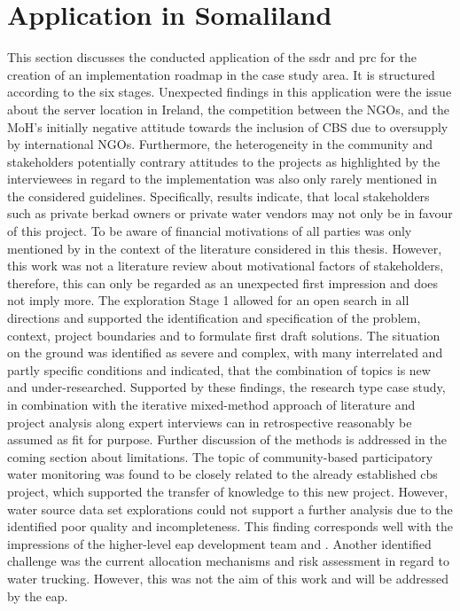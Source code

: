 \section{Application in Somaliland}

This section discusses the conducted application of the \acrshort{ssdr} and \acrshort{prc} for the creation of an implementation roadmap in the case study area. It is structured according to the six stages. Unexpected findings in this application were the issue about the server location in Ireland, the competition between the NGOs, and the MoH's initially negative attitude towards the inclusion of CBS due to oversupply by international NGOs. Furthermore, the heterogeneity in the community and stakeholders potentially contrary attitudes to the projects as highlighted by the interviewees in regard to the implementation was also only rarely mentioned in the considered guidelines. Specifically, results indicate, that local stakeholders such as private berkad owners or private water vendors may not only be in favour of this project. To be aware of financial motivations of all parties was only mentioned by \autocite{minkmanCitizenScienceWater2015} in the context of the literature considered in this thesis. However, this work was not a literature review about motivational factors of stakeholders, therefore, this can only be regarded as an unexpected first impression and does not imply more.\newline
The exploration Stage 1 allowed for an open search in all directions and supported the identification and specification of the problem, context, project boundaries and to formulate first draft solutions. The situation on the ground was identified as severe and complex, with many interrelated and partly specific conditions and indicated, that the combination of topics is new and under-researched. Supported by these findings, the research type case study, in combination with the iterative mixed-method approach of literature and project analysis along expert interviews can in retrospective reasonably be assumed as fit for purpose. Further discussion of the methods is addressed in the coming section about limitations.\newline
The topic of community-based participatory water monitoring was found to be closely related to the already established \acrshort{cbs} project, which supported the transfer of knowledge to this new project. However, water source data set explorations could not support a further analysis due to the identified poor quality and incompleteness. This finding corresponds well with the impressions of the higher-level \acrshort{eap} development team and \autocite{harrowsmithFutureForecastImpact2020}. Another identified challenge was the current allocation mechanisms and risk assessment in regard to water trucking. However, this was not the aim of this work and will be addressed by the \acrshort{eap}.
